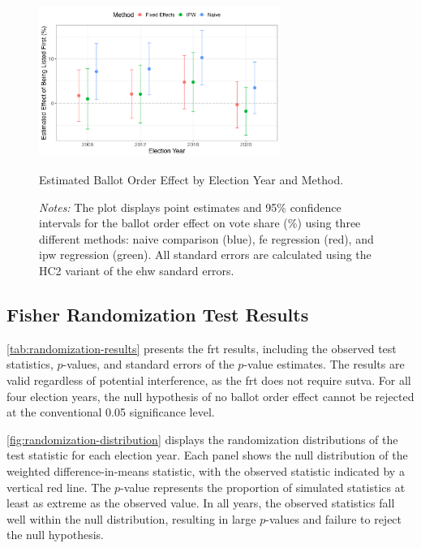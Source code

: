 \documentclass[10pt]{article}
\theoremstyle{sfstyle}
\theoremstyle{remark}
\begin{document}
\begin{figure}[htbp]
  \centering
  \includegraphics[width=0.7\textwidth]{../outputs/figures/effect_plot.png}
  \caption{Estimated Ballot Order Effect by Election Year and Method.}
  \caption*{\textit{Notes:} 
    The plot displays point estimates and 95\% confidence intervals 
    for the ballot order effect on vote share (\%)
    using three different methods: 
    naive comparison (blue), 
    \gls{fe} regression (red),
    and \gls{ipw} regression (green).
    All standard errors are calculated 
    using the HC2 variant of the \gls{ehw} sandard errors.}
  \label{fig:effect-plot}
\end{figure}

\subsection{Fisher Randomization Test Results}

\cref{tab:randomization-results} presents
the \gls{frt} results,
including the observed test statistics,
$p$-values,
and standard errors of the $p$-value estimates.
The results are valid regardless of potential interference,
as the \gls{frt} does not require \gls{sutva}.
For all four election years,
the null hypothesis of no ballot order effect
cannot be rejected at the conventional 0.05 significance level.



\cref{fig:randomization-distribution} displays
the randomization distributions
of the test statistic
for each election year.
Each panel shows the null distribution
of the weighted difference-in-means statistic,
with the observed statistic indicated by a vertical red line.
The $p$-value represents the proportion
of simulated statistics
at least as extreme as the observed value.
In all years,
the observed statistics fall well within
the null distribution,
resulting in large $p$-values
and failure to reject the null hypothesis.
\end{document}
